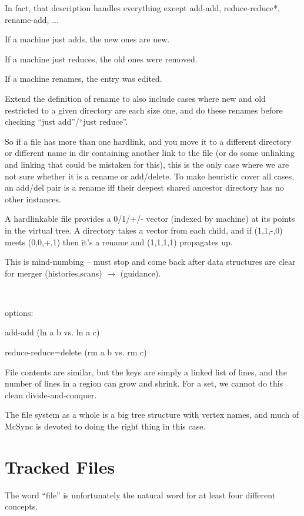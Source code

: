 \documentclass{book}
\begin{document}
In fact, that description handles everything except add-add, reduce-reduce*, rename-add, ...

If a machine just adds, the new ones are new.

If a machine just reduces, the old ones were removed.

If a machine renames, the entry was edited.

Extend the definition of rename to also include cases where new and old restricted to a given directory are each size one, and do these renames before checking ``just add''/``just reduce''.

So if a file has more than one hardlink, and you move it to a different directory or different name in dir containing another link to the file (or do some unlinking and linking that could be mistaken for this), this is the only case where we are not sure whether it is a rename or add/delete.  To make heuristic cover all cases, an add/del pair is a rename iff their deepest shared ancestor directory has no other instances.

A hardlinkable file provides a 0/1/+/- vector (indexed by machine) at its points in the virtual tree.  A directory takes a vector from each child, and if (1,1,-,0) meets (0,0,+,1) then it's a rename and (1,1,1,1) propagates up.

This is mind-numbing -- must stop and come back after data structures are clear for merger (histories,scans) $\longrightarrow$ (guidance).

~

options:

add-add (ln a b vs. ln a c)

reduce-reduce=delete (rm a b vs. rm c)

File contents are similar, but the keys are simply a linked list of lines, and the number of lines in a region can grow and shrink.  For a set, we cannot do this clean divide-and-conquer.

The file system as a whole is a big tree structure with vertex names, and much of McSync is devoted to doing the right thing in this case.



\section{Tracked Files}

The word ``file'' is unfortunately the natural word for at least four different concepts.
\end{document}
